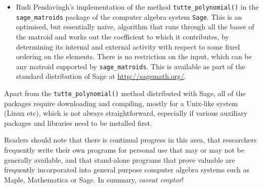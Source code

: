 \begin{itemize}
\item Rudi Pendavingh's implementation of the method \verb+tutte_polynomial()+ in 
the \verb+sage_matroids+ package of the computer algebra system \verb+Sage+.  This is an optimised, but essentially naive, algorithm that runs through all the bases of the matroid and works out the coefficient to which it contributes, by  determining its internal and external activity with respect to some fixed ordering on the elements. There is no restriction on the input, which can be any matroid supported by \verb+sage_matroids+. This is available as part of the standard distribution of Sage at \url{http://sagemath.org/}.\end{itemize}

Apart from the \verb+tutte_polynomial()+ method distributed with Sage, all of the packages require downloading and compiling, mostly for a Unix-like system (Linux etc), which is not always straightforward, especially if various auxiliary packages and libraries need to be installed first. 

Readers should note that there is continual progress in this area, that researchers frequently write their own programs 
for personal use that may or may not be generally available, and that stand-alone programs that prove valuable are frequently
incorporated into general purpose computer algebra systems such as Maple, Mathematica or Sage. In summary, {\em caveat emptor}!
